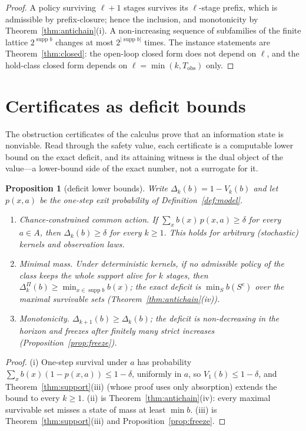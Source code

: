 \documentclass[11pt,a4paper]{article}
\theoremstyle{plain}
\newtheorem{proposition}[theorem]{Proposition}
\theoremstyle{definition}
\theoremstyle{remark}
\newcommand{\supp}{\operatorname{supp}}
\newcommand{\Tobs}{T_{\mathrm{obs}}}
\begin{document}
\begin{proof}
A policy surviving $\ell+1$ stages survives its $\ell$-stage prefix, which is admissible by prefix-closure; hence the inclusion, and monotonicity by Theorem~\ref{thm:antichain}(i). A non-increasing sequence of subfamilies of the finite lattice $2^{\supp b}$ changes at most $2^{|\supp b|}$ times. The instance statements are Theorem~\ref{thm:closed}: the open-loop closed form does not depend on $\ell$, and the hold-class closed form depends on $\ell=\min(k,\Tobs)$ only.
\end{proof}
\section{Certificates as deficit bounds}\label{sec:deficit}

The obstruction certificates of the calculus prove that an information state is nonviable. Read through the safety value, each certificate is a computable lower bound on the exact deficit, and its attaining witness is the dual object of the value---a lower-bound side of the exact number, not a surrogate for it.

\begin{proposition}[deficit lower bounds]\label{prop:deficit}
Write $\Delta_k(b)=1-V_k(b)$ and let $p(x,a)$ be the one-step exit probability of Definition~\ref{def:model}.
\begin{enumerate}[leftmargin=1.6em,itemsep=1pt]
\item[(i)] \emph{Chance-constrained common action.} If $\sum_{x}b(x)\,p(x,a)\ge\delta$ for every $a\in A$, then $\Delta_k(b)\ge\delta$ for every $k\ge1$. This holds for arbitrary (stochastic) kernels and observation laws.
\item[(ii)] \emph{Minimal mass.} Under deterministic kernels, if no admissible policy of the class keeps the whole support alive for $k$ stages, then $\Delta^{\Pi}_k(b)\ge\min_{x\in\supp b}b(x)$; the exact deficit is $\min_S b(S^{c})$ over the maximal survivable sets (Theorem~\ref{thm:antichain}(iv)).
\item[(iii)] \emph{Monotonicity.} $\Delta_{k+1}(b)\ge\Delta_k(b)$; the deficit is non-decreasing in the horizon and freezes after finitely many strict increases (Proposition~\ref{prop:freeze}).
\end{enumerate}
\end{proposition}

\begin{proof}
(i) One-step survival under $a$ has probability $\sum_x b(x)(1-p(x,a))\le1-\delta$, uniformly in $a$, so $V_1(b)\le1-\delta$, and Theorem~\ref{thm:support}(iii) (whose proof uses only absorption) extends the bound to every $k\ge1$. (ii) is Theorem~\ref{thm:antichain}(iv): every maximal survivable set misses a state of mass at least $\min b$. (iii) is Theorem~\ref{thm:support}(iii) and Proposition~\ref{prop:freeze}.
\end{proof}
\end{document}
